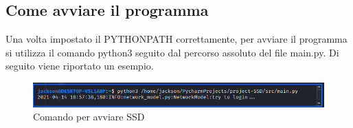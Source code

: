 \subsection{Come avviare il programma}
Una volta impostato il PYTHONPATH correttamente, per avviare il programma si utilizza il comando python3 seguito dal percorso assoluto del file main.py. Di seguito viene riportato un esempio.
\begin{figure}[H]
    \centering
    \includegraphics[scale = 0.50]{components/img/avvio.png}
    \caption{Comando per avviare SSD}
    \label{fig:comando per impostare PYTHONPATH su windows}
\end{figure}